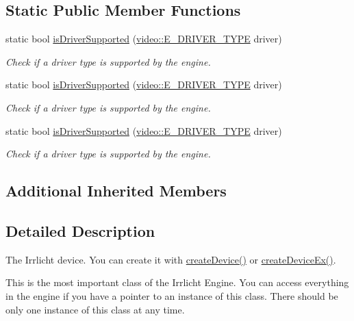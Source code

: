 \subsection*{Static Public Member Functions}
\begin{DoxyCompactItemize}
\item 
static bool \hyperlink{classirr_1_1IrrlichtDevice_a5a74995aec731b26c6a9cb5bea6842fe}{is\+Driver\+Supported} (\hyperlink{namespaceirr_1_1video_ae35a6de6d436c76107ad157fe42356d0}{video\+::\+E\+\_\+\+D\+R\+I\+V\+E\+R\+\_\+\+T\+Y\+PE} driver)
\begin{DoxyCompactList}\small\item\em Check if a driver type is supported by the engine. \end{DoxyCompactList}\item 
static bool \hyperlink{classirr_1_1IrrlichtDevice_a5a74995aec731b26c6a9cb5bea6842fe}{is\+Driver\+Supported} (\hyperlink{namespaceirr_1_1video_ae35a6de6d436c76107ad157fe42356d0}{video\+::\+E\+\_\+\+D\+R\+I\+V\+E\+R\+\_\+\+T\+Y\+PE} driver)
\begin{DoxyCompactList}\small\item\em Check if a driver type is supported by the engine. \end{DoxyCompactList}\item 
static bool \hyperlink{classirr_1_1IrrlichtDevice_a5a74995aec731b26c6a9cb5bea6842fe}{is\+Driver\+Supported} (\hyperlink{namespaceirr_1_1video_ae35a6de6d436c76107ad157fe42356d0}{video\+::\+E\+\_\+\+D\+R\+I\+V\+E\+R\+\_\+\+T\+Y\+PE} driver)
\begin{DoxyCompactList}\small\item\em Check if a driver type is supported by the engine. \end{DoxyCompactList}\end{DoxyCompactItemize}
\subsection*{Additional Inherited Members}


\subsection{Detailed Description}
The Irrlicht device. You can create it with \hyperlink{namespaceirr_a57653fdaf6b2746b141ba2bb07d8bba6}{create\+Device()} or \hyperlink{namespaceirr_ae0a823eb5404bbf156965e7051798496}{create\+Device\+Ex()}. 

This is the most important class of the Irrlicht Engine. You can access everything in the engine if you have a pointer to an instance of this class. There should be only one instance of this class at any time. 


